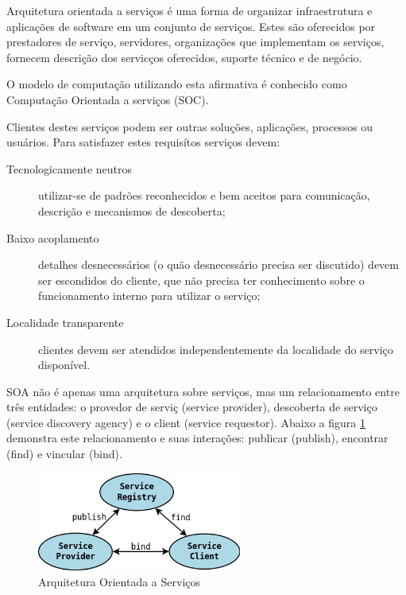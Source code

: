Arquitetura orientada a servi\c{c}os \'e uma forma de organizar infraestrutura e aplica\c{c}\~oes de software em um conjunto de servi\c{c}os. Estes s\~ao oferecidos por prestadores de servi\c{c}o, servidores, organiza\c{c}\~oes que implementam os servi\c{c}os, fornecem descri\c{c}\~ao dos servic\c{c}os oferecidos, suporte t\'ecnico e de neg\'ocio.

O modelo de computa\c{c}\~ao utilizando esta afirmativa \'e conhecido como Computa\c{c}\~ao Orientada a servi\c{c}os (SOC). \cite{581580}

Clientes destes servi\c{c}os podem ser outras solu\c{c}\~oes, aplica\c{c}\~oes, processos ou usu\'arios. Para satisfazer estes requis\'itos servi\c{c}os devem:
\begin{description}
    \item[Tecnologicamente neutros] utilizar-se de padr\~oes reconhecidos e bem aceitos para comunica\c{c}\~ao, descri\c{c}\~ao e mecanismos de descoberta;
    \item[Baixo acoplamento] detalhes desnecess\'arios (o qu\~ao desnecess\'ario precisa ser discutido) devem ser escondidos do cliente, que n\~ao precisa ter conhecimento sobre o funcionamento interno para utilizar o servi\c{c}o;
    \item[Localidade transparente] clientes devem ser atendidos independentemente da localidade do servi\c{c}o dispon\'ivel.
\end{description}

SOA n\~ao \'e apenas uma arquitetura sobre servi\c{c}os, mas um relacionamento entre tr\^es entidades: o provedor de servi\c{c} (service provider), descoberta de servi\c{c}o (service discovery agency) e o client (service requestor).  Abaixo a figura \ref{soaOverview} demonstra este relacionamento e suas intera\c{c}\~oes: publicar (publish), encontrar (find) e vincular (bind).

\begin{figure}[h]
   \label{soaOverview}
   \centering
   \includegraphics[width=0.6\textwidth]{figuras/soa.png}
   \caption{Arquitetura Orientada a Servi\c{c}os}
\end{figure}

